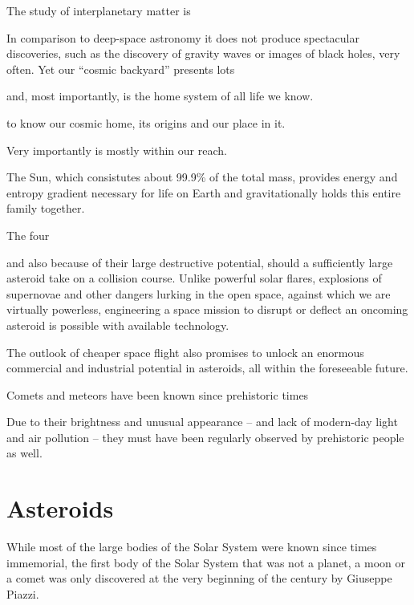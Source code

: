 
The study of interplanetary matter is 

In comparison to deep-space astronomy it does not produce spectacular discoveries,
such as the discovery of gravity waves or images of black holes, very often.
Yet our ``cosmic backyard'' presents lots 

and, most importantly, is the home system of all life we know.

to know our cosmic home, its origins and our place in it.

Very importantly is mostly within our reach.

The Sun, which consistutes about \num{99.9}\% of the total mass, provides energy and entropy gradient
necessary for life on Earth and gravitationally holds this entire family together.

The four 

and also because of their large destructive potential, should a sufficiently large asteroid take on a collision course.
Unlike powerful solar flares, explosions of supernovae and other dangers lurking in the open space, against which we are
virtually powerless, engineering a space mission to disrupt or deflect an oncoming asteroid is possible with
available technology.

The outlook of cheaper space flight also promises to unlock an enormous commercial and industrial potential in asteroids,
all within the foreseeable future.

Comets and meteors have been known since prehistoric times

Due to their brightness and unusual appearance -- and lack of modern-day light and air pollution -- they
must have been regularly observed by prehistoric people as well.



\section{Asteroids} \label{aa}
    While most of the large bodies of the Solar System were known since times immemorial,
    the first body of the Solar System that was not a planet, a moon or a comet was only discovered at
    the very beginning of the  century by Giuseppe Piazzi.

